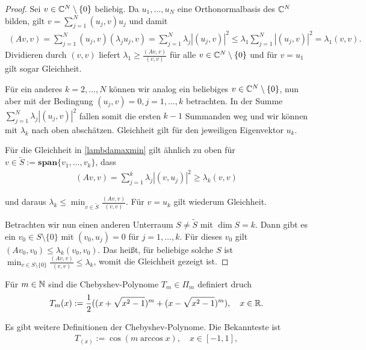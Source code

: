 \documentclass{article}
\begin{document}
\begin{proof}
	Sei $v \in \mathbb{C}^N \setminus \{0\}$ beliebig. Da $u_1, \dots, u_N$ eine Orthonormalbasis des $\mathbb{C}^N$ bilden, gilt $ v = \sum_{j=1}^{N} (u_j,v) u_j$ und damit
	\begin{align*}
		(Av,v) = \sum_{j=1}^{N} (u_j,v) (\lambda_j u_j,v) = \sum_{j=1}^{N} \lambda_j |(u_j,v)|^2 \leq \lambda_1 \sum_{j=1}^{N} |(u_j,v)|^2 = \lambda_1 (v,v).
	\end{align*}
	Dividieren durch $(v,v)$ liefert $\lambda_1 \geq \frac{(Av,v)}{(v,v)}$ für alle $v \in \mathbb{C}^N \setminus \{0\}$ und für $v = u_1$ gilt sogar Gleichheit.

	Für ein anderes $k = 2,\dots,N$ können wir analog ein beliebiges $v \in \mathbb{C}^N \setminus \{0\}$, nun aber mit der Bedingung $(u_j,v) = 0, j=1,\dots,k$ betrachten. In der Summe $\sum_{j=1}^{N} \lambda_j |(u_j,v)|^2$ fallen somit die ersten $k-1$ Summanden weg und wir können mit $\lambda_k$ nach oben abschätzen. Gleichheit gilt für den jeweiligen Eigenvektor $u_k$.

	Für die Gleichheit in \ref{lambdamaxmin} gilt ähnlich zu oben für $v \in \tilde{S} := \textbf{span}\{v_1, \dots, v_k\}$, dass
	\begin{align*}
		(Av,v) = \sum_{j=1}^{k} \lambda_j |(v,u_j)|^2 \geq \lambda_k (v,v)
	\end{align*}

	und daraus $\lambda_k \leq \min_{v \in \tilde{S}} \frac{(Av,v)}{(v,v)}$. Für $v = u_k$ gilt wiederum Gleichheit.

	Betrachten wir nun einen anderen Unterraum $S \neq \tilde{S}$ mit $\dim S = k$. Dann gibt es ein $v_0 \in S \setminus \{0\}$ mit $(v_0,u_j) = 0$ für $j=1,\dots,k$. Für dieses $v_0$ gilt $(Av_0,v_0) \leq \lambda_k (v_0,v_0)$. Das heißt, für beliebige solche $S$ ist $\min_{v \in S \setminus \{0\}} \frac{(Av,v)}{(v,v)} \leq \lambda_k$, womit die Gleichheit gezeigt ist.

\end{proof}

\begin{definition}
	Für $m \in \mathbb{N}$ sind die Chebyshev-Polynome $T_m \in \Pi_m$ definiert druch
	\begin{align}\label{chebyshev}
		T_m(x) := \frac{1}{2}((x+ \sqrt{x^2 - 1})^m + (x- \sqrt{x^2 - 1})^m), \quad x \in \mathbb{R}.
	\end{align}
\end{definition}

Es gibt weitere Definitionen der Chebyshev-Polynome. Die Bekannteste ist
\begin{align}\label{chebyalt}
	T_(x) := \cos(m \arccos x), \quad x \in [-1,1],
\end{align}
\end{document}
